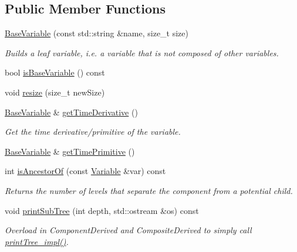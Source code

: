 \subsection*{Public Member Functions}
\begin{DoxyCompactItemize}
\item 
\hyperlink{classocra_1_1BaseVariable_ae86fd20357d1b333c73d22b7a9a010f6}{Base\+Variable} (const std\+::string \&name, size\+\_\+t size)
\begin{DoxyCompactList}\small\item\em Builds a leaf variable, i.\+e. a variable that is not composed of other variables. \end{DoxyCompactList}\item 
bool \hyperlink{classocra_1_1BaseVariable_affe666305f8dd8f2ffd13394a525d9fd}{is\+Base\+Variable} () const 
\item 
void \hyperlink{classocra_1_1BaseVariable_a5d473eeb113e4751c27cf6af7af62919}{resize} (size\+\_\+t new\+Size)
\item 
\hyperlink{classocra_1_1BaseVariable}{Base\+Variable} \& \hyperlink{classocra_1_1BaseVariable_a79a86d7415d8b460ad9f526f685961dc}{get\+Time\+Derivative} ()
\begin{DoxyCompactList}\small\item\em Get the time derivative/primitive of the variable. \end{DoxyCompactList}\item 
\hyperlink{classocra_1_1BaseVariable}{Base\+Variable} \& \hyperlink{classocra_1_1BaseVariable_aa985b0703fc0a2edcd66a7c4c4ee05e4}{get\+Time\+Primitive} ()
\item 
int \hyperlink{classocra_1_1BaseVariable_ae5e452cc120ff267186d560e6f8fe018}{is\+Ancestor\+Of} (const \hyperlink{classocra_1_1Variable}{Variable} \&var) const 
\begin{DoxyCompactList}\small\item\em Returns the number of levels that separate the component from a potential child. \end{DoxyCompactList}\item 
void \hyperlink{classocra_1_1BaseVariable_a66ef58604609abfc21ddfbbab1abc16e}{print\+Sub\+Tree} (int depth, std\+::ostream \&os) const 
\begin{DoxyCompactList}\small\item\em Overload in Component\+Derived and Composite\+Derived to simply call \hyperlink{classocra_1_1Leaf_a5dda158daaaaad1340c92892afa6ba67}{print\+Tree\+\_\+impl()}. \end{DoxyCompactList}\end{DoxyCompactItemize}
